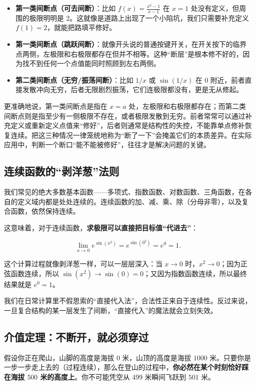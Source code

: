 \begin{itemize}
\tightlist
  \item \textbf{第一类间断点（可去间断）}：比如 \(f(x)=\frac{x^2-1}{x-1}\) 在 \(x=1\) 处没有定义，但周围的极限明明是 \(2\)。这就像是道路上出现了一个小陷坑，我们只需要补充定义 \(f(1)=2\)，就能把路填平修好。
  \item \textbf{第一类间断点（跳跃间断）}：就像开头说的普通按键开关，在开关按下的临界点两侧，左极限和右极限都存在但并不相等。这种``断层''是根本修不好的，因为找不到任何一个点值能同时照顾到左右两侧。
  \item \textbf{第二类间断点（无穷/振荡间断）}：比如 \(1/x\) 或 \(\sin(1/x)\) 在 \(0\) 附近，前者直接发散冲向无穷，后者无限剧烈振荡，它们连极限都没有，更是无从修起。
\end{itemize}

更准确地说，第一类间断点是指在 \(x=a\) 处，左极限和右极限都存在；而第二类间断点则是指至少有一侧极限不存在，或者极限发散到无穷。前者常常可以通过补充定义或重新定义点值来“修好”，后者则通常是结构性的失控，不能靠单点修补恢复连续。把这三种情况一律笼统地称为``断了一下''会掩盖它们的本质差异。在实际应用中，判断一个断口``能不能被修好''，往往才是解决问题的关键。

\subsection{连续函数的“剥洋葱”法则}

我们常见的绝大多数基本函数——多项式、指数函数、对数函数、三角函数，在各自的定义域内都是处处连续的。连续函数的加、减、乘、除（分母非零），以及复合函数，依然保持连续。

这意味着，对于连续函数，\textbf{求极限可以直接把目标值``代进去''}：

\[
\lim_{x\to0}e^{\sin(x^2)}=e^{\sin(0^2)}=e^0=1.
\]

这个计算过程就像剥洋葱一样，可以一层层深入：当 \(x\to0\) 时，\(x^2\to0\)；因为正弦函数连续，所以 \(\sin(x^2)\to\sin(0)=0\)；又因为指数函数连续，所以最终结果就是 \(e^0=1\)。

我们在日常计算里不假思索的``直接代入法''，合法性正来自于连续性。反过来说，一旦复合结构的某一层发生了间断，``直接代入''的魔法就会立刻失效。

\subsection{介值定理：不断开，就必须穿过}

假设你正在爬山，山脚的高度是海拔 \(0\) 米，山顶的高度是海拔 \(1000\) 米。只要你是一步一步走上去的（过程连续），那么在登山的过程中，\textbf{你必然在某个时刻恰好踩在海拔 \(500\) 米的高度上}。你不可能凭空从 \(499\) 米瞬间飞跃到 \(501\) 米。

